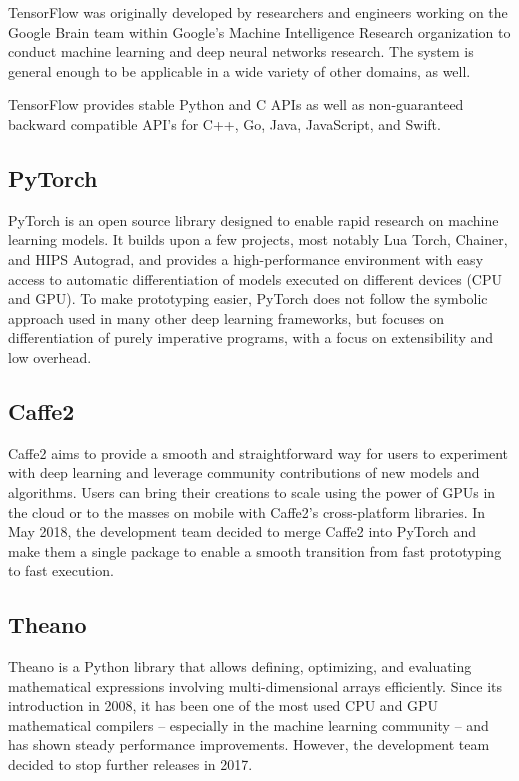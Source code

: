         TensorFlow was originally developed by researchers and engineers working on the Google Brain team within Google's Machine Intelligence Research organization to conduct machine learning and deep neural networks research. The system is general enough to be applicable in a wide variety of other domains, as well.

        TensorFlow provides stable Python and C APIs as well as non-guaranteed backward compatible API's for C++, Go, Java, JavaScript, and Swift. 
        
    \subsection{PyTorch}
        PyTorch \cite{paszke2017automatic} is an open source library designed to enable rapid research on machine learning models. It builds upon a few projects, most notably Lua Torch, Chainer, and HIPS Autograd, and provides a high-performance environment with easy access to automatic differentiation of models executed on different devices (CPU and GPU). To make prototyping easier, PyTorch does not follow the symbolic approach used in many other deep learning frameworks, but focuses on differentiation of purely imperative programs, with a focus on extensibility and low overhead. 
        
    \subsection{Caffe2}
        Caffe2 \cite{caffe2} aims to provide a smooth and straightforward way for users to experiment with deep learning and leverage community contributions of new models and algorithms. Users can bring their creations to scale using the power of GPUs in the cloud or to the masses on mobile with Caffe2's cross-platform libraries. In May 2018, the development team decided to merge Caffe2 into PyTorch and make them a single package to enable a smooth transition from fast prototyping to fast execution. 
        
    \subsection{Theano}
        Theano \cite{2016arXiv160502688short} is a Python library that allows defining, optimizing, and evaluating mathematical expressions involving multi-dimensional arrays efficiently. Since its introduction in 2008, it has been one of the most used CPU and GPU mathematical compilers – especially in the machine learning community -- and has shown steady performance improvements. However, the development team decided to stop further releases in 2017. 
        
